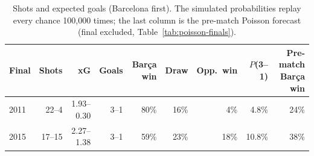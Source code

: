 \begin{table}[t]
\centering\footnotesize\setlength{\tabcolsep}{4pt}
\caption{Shots and expected goals (Barcelona first). The simulated probabilities replay every chance 100{,}000 times; the last column is the pre-match Poisson forecast (final excluded, Table~\ref{tab:poisson-finals}).}
\label{tab:xg}
\begin{tabular}{lrrrrrrrr}
\toprule
Final & Shots & xG & Goals & Barça win & Draw & Opp.\ win & $P$(3--1) & Pre-match Barça win \\
\midrule
2011 & 22--4 & 1.93--0.30 & 3--1 & 80\% & 16\% & 4\% & 4.8\% & 24\% \\
2015 & 17--15 & 2.27--1.38 & 3--1 & 59\% & 23\% & 18\% & 10.8\% & 38\% \\
\bottomrule
\end{tabular}
\end{table}
